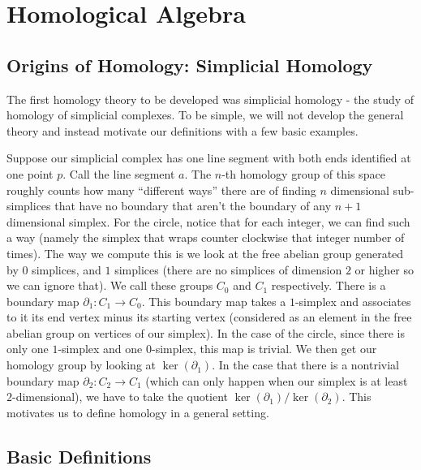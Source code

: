 \chapter{Homological Algebra}
\section{Origins of Homology: Simplicial Homology}

The first homology theory
to be developed was simplicial homology - the study of homology
of simplicial
complexes. To be simple, we will not develop the general theory
and instead
motivate our definitions with a few basic examples.

\begin{example} Suppose
our simplicial complex has one line segment with both ends
identified at
one point $p$. Call the line segment $a$. The $n$-th homology
group of this
space roughly counts how many ``different ways'' there are of
finding $n$
dimensional sub-simplices that have no boundary that aren't the
boundary of
any $n+1$ dimensional simplex. For the circle, notice that for
each integer,
we can find such a way (namely the simplex that wraps counter
clockwise that
integer number of times). The way we compute this is we look at
the free abelian group generated by $0$ simplices, and $1$
simplices (there are no simplices of
dimension $2$ or higher so we can ignore that). We call these
groups $C_0$ and
$C_1$ respectively. There is a boundary map $\partial_1:
C_1\rightarrow C_0$.
This boundary map takes a $1$-simplex and associates to it its
end vertex minus
its starting vertex (considered as an element in the free
abelian group on
vertices of our simplex). In the case of the circle, since there
is only one
$1$-simplex and one $0$-simplex, this map is trivial. We then
get our homology
group by looking at $\ker(\partial_1)$. In the case that there
is a nontrivial
boundary map $\partial_2: C_2\rightarrow C_1$ (which can only
happen when our
simplex is at least $2$-dimensional), we have to take the
quotient
$\ker(\partial_1)/\ker(\partial_2)$. This motivates us to define
homology in a
general setting.
\end{example}

\section{Basic Definitions}


